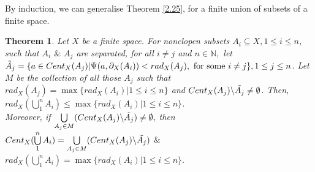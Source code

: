 \documentclass[12pt]{amsart}
\newtheorem{theorem}[definition]{Theorem}
\newtheorem{remark}[definition]{Remark}
\begin{document}




By induction, we can generalise Theorem \ref{2.25}, for a finite union of subsets of a finite space.

\begin{theorem}\label{3.37}
	Let $X$ be a finite space. For nonclopen subsets $A_i \subseteq X, 1\leq i\leq n$, such that $A_i$ $\&$ $A_j$ are separated,
	for all $i\neq j$ and $n\in \mathbb{N},$
	let $\Tilde{A}_{j}=\{a\in Cent_{X}(A_{j})|
	\Psi(a,\partial_{X}(A_{i}))<rad_{X}(A_{j}),\text{ for some } i\neq j\}, 1\leq j\leq n$. Let $M$ be the collection of all those $A_j$ such that $rad_{X}(A_{j})= \max\{rad_{X}(A_{i})|1\leq i \leq n\}$ and $Cent_{X}(A_j)\backslash\Tilde{A_j}\neq\emptyset$. Then, $rad_{X}(\bigcup\limits_{1}^{n}A_{i}) \leq  \max\{rad_{X}(A_{i})|1\leq i\leq n\}$.\\
	Moreover, if $\bigcup\limits_{A_j\in M}(Cent_{X}(A_j)\backslash\Tilde{A_j})\neq\emptyset,$ 
	then  $Cent_{X}(\bigcup\limits_{1}^{n}A_{i}) = \bigcup\limits_{A_{j}\in M}(Cent_{X}(A_{j})\backslash \Tilde{A_{j}})$ $\&$ $rad_{X}(\bigcup\limits_{1}^{n}A_{i}) = \max\{rad_{X}(A_{i})|1\leq i \leq n\}.$
\end{theorem}
\end{document}

